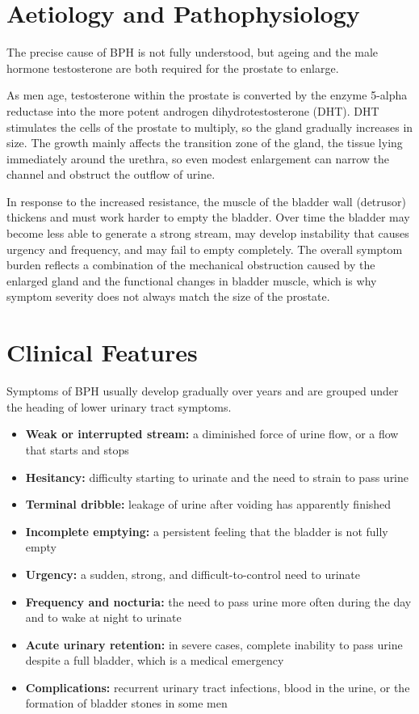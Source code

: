 \section*{Aetiology and Pathophysiology}
The precise cause of BPH is not fully understood, but ageing and the male hormone testosterone are both required for the prostate to enlarge.

As men age, testosterone within the prostate is converted by the enzyme 5-alpha reductase into the more potent androgen dihydrotestosterone (DHT). DHT stimulates the cells of the prostate to multiply, so the gland gradually increases in size. The growth mainly affects the transition zone of the gland, the tissue lying immediately around the urethra, so even modest enlargement can narrow the channel and obstruct the outflow of urine.

In response to the increased resistance, the muscle of the bladder wall (detrusor) thickens and must work harder to empty the bladder. Over time the bladder may become less able to generate a strong stream, may develop instability that causes urgency and frequency, and may fail to empty completely. The overall symptom burden reflects a combination of the mechanical obstruction caused by the enlarged gland and the functional changes in bladder muscle, which is why symptom severity does not always match the size of the prostate.

\section*{Clinical Features}
Symptoms of BPH usually develop gradually over years and are grouped under the heading of lower urinary tract symptoms.

\begin{itemize}
    \item \textbf{Weak or interrupted stream:} a diminished force of urine flow, or a flow that starts and stops
    \item \textbf{Hesitancy:} difficulty starting to urinate and the need to strain to pass urine
    \item \textbf{Terminal dribble:} leakage of urine after voiding has apparently finished
    \item \textbf{Incomplete emptying:} a persistent feeling that the bladder is not fully empty
    \item \textbf{Urgency:} a sudden, strong, and difficult-to-control need to urinate
    \item \textbf{Frequency and nocturia:} the need to pass urine more often during the day and to wake at night to urinate
    \item \textbf{Acute urinary retention:} in severe cases, complete inability to pass urine despite a full bladder, which is a medical emergency
    \item \textbf{Complications:} recurrent urinary tract infections, blood in the urine, or the formation of bladder stones in some men
\end{itemize}

